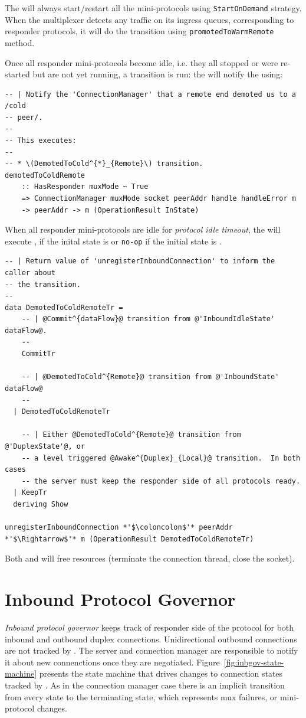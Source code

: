 The \inbgov{} will always start/restart all the mini-protocols using
\texttt{StartOnDemand} strategy.  When the multiplexer detects
any traffic on its ingress queues, corresponding to responder protocols,
it will do the \PromotedToWarmDupRem{} transition using
\texttt{promotedToWarmRemote} method.

Once all responder mini-protocols become idle, i.e. they all stopped or were
re-started but are not yet running, a \DemotedToColdAnyRem{} transition is
run: the \inbgov{} will notify the \connmngr{} using:

\begin{lstlisting}
-- | Notify the 'ConnectionManager' that a remote end demoted us to a /cold
-- peer/.
--
-- This executes:
--
-- * \(DemotedToCold^{*}_{Remote}\) transition.
demotedToColdRemote
    :: HasResponder muxMode ~ True
    => ConnectionManager muxMode socket peerAddr handle handleError m
    -> peerAddr -> m (OperationResult InState)
\end{lstlisting}

When all responder mini-protocols are idle for \textit{protocol idle timeout},
the \inbgov{} will execute \CommitUni{}, \CommitDup{} if the inital state is
\InboundIdleStateDup{} or \texttt{no-op} if the initial state is
\OutboundStateDup{}.

\begin{lstlisting}
-- | Return value of 'unregisterInboundConnection' to inform the caller about
-- the transition.
--
data DemotedToColdRemoteTr =
    -- | @Commit^{dataFlow}@ transition from @'InboundIdleState' dataFlow@.
    --
    CommitTr

    -- | @DemotedToCold^{Remote}@ transition from @'InboundState' dataFlow@
    --
  | DemotedToColdRemoteTr

    -- | Either @DemotedToCold^{Remote}@ transition from @'DuplexState'@, or
    -- a level triggered @Awake^{Duplex}_{Local}@ transition.  In both cases
    -- the server must keep the responder side of all protocols ready.
  | KeepTr
  deriving Show

unregisterInboundConnection *'$\coloncolon$'* peerAddr *'$\Rightarrow$'* m (OperationResult DemotedToColdRemoteTr)
\end{lstlisting}
Both \CommitUni{} and \CommitDup{} will free resources (terminate the
connection thread, close the socket).


\section{Inbound Protocol Governor}
\textit{Inbound protocol governor} keeps track of responder side of the protocol for
both inbound and outbound duplex connections.  Unidirectional outbound
connections are not tracked by \inbgov{}.  The server and connection manager
are responsible to notify it about new connenctions once they are negotiated.
Figure~\ref{fig:inbgov-state-machine} presents the state machine that drives
changes to connection states tracked by \inbgov{}.  As in the connection
manager case there is an implicit transition from every state to the
terminating state, which represents mux failures, or mini-protocol changes.

